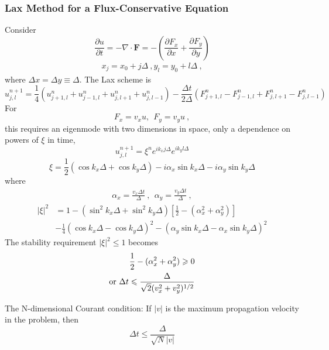\documentclass[12pt,a4paper]{article}
\renewcommand{\vec}[1]{\boldsymbol{#1}}
\begin{document}
\subsubsection{Lax Method for a Flux-Conservative Equation}
Consider
\begin{equation}
\frac{\partial u}{\partial t} = -\nabla \cdot \vec{F} =-\left(\frac{\partial F_x}{\partial x} +\frac{\partial F_y}{\partial y} \right)
\end{equation}
\begin{align}
x_j = x_0 +j\Delta ~,
y_l = y_0 +l\Delta ~,
\end{align}
where $\Delta x = \Delta y \equiv \Delta$. The Lax scheme is
\begin{equation}
u_{j, l}^{n+1} = \frac{1}{4} (u_{j+1, l}^{n} +u_{j-1, l}^{n} +u_{j, l+1}^{n} +u_{j, l-1}^{n}) -\frac{\Delta t}{2\Delta} (F_{j+1, l}^{n} -F_{j-1, l}^{n} +F_{j, l+1}^{n} -F_{j, l-1}^{n})
\end{equation}
For 
\begin{equation}
F_x = v_x u, ~~ F_y = v_y u ~,
\end{equation}
this requires an eigenmode with two dimensions in space, only a dependence on powers of $\xi$ in time,
\begin{equation}
u_{j, l}^{n+1} = \xi^n e^{ik_x j\Delta} e^{ik_y l\Delta}
\end{equation}
\begin{equation}
\xi = \frac{1}{2} (\cos k_x \Delta +\cos k_y \Delta) -i\alpha_x \sin k_x \Delta -i\alpha_y \sin k_y \Delta
\end{equation}
where
\begin{align}
\alpha_x = \frac{v_x \Delta t}{\Delta} ~, ~~\alpha_y = \frac{v_y \Delta t}{\Delta} ~,
\end{align}
\begin{align}
\nonumber |\xi |^2 &= 1-(\sin^2 k_x \Delta +\sin^2 k_y \Delta) \left[\frac{1}{2} -(\alpha_x^2 +\alpha_y^2) \right] \\
& -\frac{1}{4}(\cos k_x \Delta -\cos k_y \Delta)^2 -(\alpha_y \sin k_x \Delta -\alpha_x \sin k_y \Delta)^2
\end{align}
The stability requirement $|\xi |^2 \leqslant 1$ becomes
\begin{align}
\frac{1}{2}-(\alpha_x^2 +\alpha_y^2) \geqslant 0 \\
{\rm or } ~ \Delta t \leqslant \frac{\Delta}{\sqrt{2}(v_x^2 +v_y^2)^{1/2}}
\end{align}

The N-dimensional Courant condition: If $|v|$ is the maximum propagation velocity in the problem, then
\begin{equation}
\Delta t \leqslant \frac{\Delta}{\sqrt{N}|v|}
\end{equation}
\end{document}
